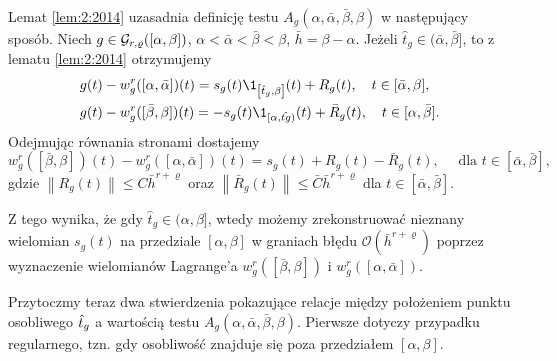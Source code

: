 \documentclass[oik, pdftex, man]{mgrwms}
\begin{document}
    Lemat \ref{lem:2:2014} uzasadnia definicję testu $A_{g}(\alpha, \bar{\alpha}, \bar{\beta}, \beta)$ w następujący sposób.
    \noindent
    Niech $g \in \mathcal{G}_{r,\varrho}([\alpha,\beta])$, $\alpha<\bar{\alpha}<\bar{\beta}<\beta$, $\bar{h}=\beta-\alpha$. Jeżeli $\hat{t}_{g} \in(\bar{\alpha}, \bar{\beta}]$, to z lematu \ref{lem:2:2014} otrzymujemy
    \begin{equation*}
        \begin{aligned}
            &g(t)-w_{g}^{r}([\alpha, \bar{\alpha}])(t)=s_{g}(t) \1_{\left[\hat{t}_{g}, \beta\right]}(t)+R_{g}(t), \quad t \in[\bar{\alpha}, \beta], \\
            &g(t)-w_{g}^{r}([\bar{\beta}, \beta])(t)=-s_{g}(t) \1_{[\alpha, \hat{t g})}(t)+\bar{R}_{g}(t), \quad t \in[\alpha, \bar{\beta}].
        \end{aligned}
    \end{equation*}
    Odejmując równania stronami dostajemy
    \begin{equation} \label{eq:16}
        w_{g}^{r}([\bar{\beta}, \beta])(t)-w_{g}^{r}([\alpha, \bar{\alpha}])(t)=s_{g}(t)+R_{g}(t)-\bar{R}_{g}(t), \quad \text{ dla }t \in[\bar{\alpha}, \bar{\beta}],
    \end{equation}
    gdzie $\left\|R_{g}(t)\right\| \leq C\bar{h}^{r+\varrho}$ oraz $\left\|\bar{R}_{g}(t)\right\| \leq \bar{C} \bar{h}^{r+\varrho}$ dla $t \in[\bar{\alpha}, \bar{\beta}]$.

    Z tego wynika, że gdy $\hat{t}_{g} \in (\alpha, \beta]$, wtedy możemy zrekonstruować nieznany wielomian $s_{g}(t)$ na przedziale $[\alpha, \beta]$ w graniach błędu $\mathcal{O}(\bar{h}^{r+\varrho})$ poprzez wyznaczenie wielomianów Lagrange'a $w_{g}^{r}([\bar{\beta}, \beta])$ i $w_{g}^{r}([\alpha, \bar{\alpha}])$.

    Przytoczmy teraz dwa stwierdzenia pokazujące relacje między położeniem punktu osobliwego $\hat{t}_{g}$ a wartością testu $A_{g}(\alpha, \bar{\alpha}, \bar{\beta}, \beta)$. Pierwsze dotyczy przypadku regularnego, tzn. gdy osobliwość znajduje się poza przedziałem $[\alpha, \beta]$.
\end{document}
